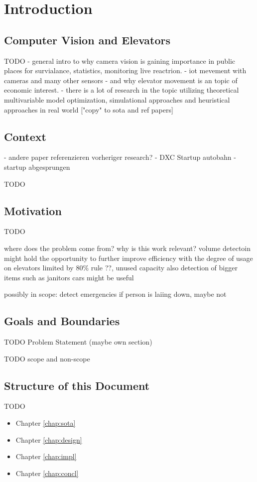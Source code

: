 \chapter{Introduction}
\label{chap:intro}

\section{Computer Vision and Elevators}


\autocite{reddy2013foreground}

TODO
- general intro to why camera vision is gaining importance in public places for survialance, statistics, monitoring live reactrion. 
- iot mevement with cameras and many other sensors
- and why elevator movement is an topic of economic interest.
- there is a lot of research in the topic utilizing theoretical multivariable model optimization, simulational approaches and heuristical approaches in real world ["copy" to sota and ref papers]


\section{Context}

- andere paper referenzieren vorheriger research?
- DXC Startup autobahn 
- startup abgesprungen

TODO

\section{Motivation}


TODO

where does the problem come from?
why is this work relevant?
volume detectoin might hold the opportunity to further improve efficiency with the degree of usage on elevators
limited by 80\% rule ??, unused capacity
also detection of bigger items such as janitors cars might be useful

possibly in scope: detect emergencies if person is laiing down, maybe not

\section{Goals and Boundaries}

TODO Problem Statement (maybe own section)

TODO scope and non-scope

\section{Structure of this Document}

TODO

\begin{itemize}
    \item Chapter \ref{chap:sota}
    \item Chapter \ref{chap:design}
    \item Chapter \ref{chap:impl}
    \item Chapter \ref{chap:concl}
\end{itemize}